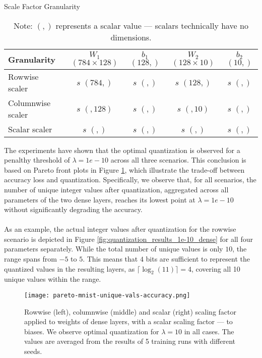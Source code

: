 \begin{table}[h!]
  \centering
  \caption{Scale Factor Granularity}
  \label{tab:scalefactorgranularitydense}
  \begin{tabular}{l|c|c|c|c}
  \hline
  \textbf{Granularity}        & \( W_1 \) \( (784 \times 128) \)       & \( b_1 \) \( (128,) \)        & \( W_2 \) \( (128 \times 10) \)     & \( b_2 \) \( (10,) \) \\ \hline
  Rowwise scaler              & \( s \) \( (784, ) \)                 & \( s \) \( (,) \)             & \( s \) \( (128, ) \)              & \( s \) \( (,) \)     \\ \hline
  Columnwise scaler           & \( s \) \( (,128) \)                  & \( s \) \( (,) \)             & \( s \) \( (,10) \)                & \( s \) \( (,) \)     \\ \hline
  Scalar scaler               & \( s \) \( (,) \)                     & \( s \) \( (,) \)             & \( s \) \( (,) \)                  & \( s \) \( (,) \)     \\ \hline
  \end{tabular}
  \vspace{0.5em}
  \caption*{\footnotesize Note: \( (,) \) represents a scalar value — scalars technically have no dimensions.}
\end{table}

\noindent The experiments have shown that the optimal quantization is observed for a penalthy threshold of 
\( \lambda = 1e-10 \) across all three scenarios.
This conclusion is based on Pareto front plots in Figure \ref{fig:pareto-mnist-unique-vals-accuracy},
which illustrate the trade-off between accuracy loss and quantization.
Specifically, we observe that, for all scenarios, 
the number of unique integer values after quantization, 
aggregated across all parameters of the two dense layers, reaches its lowest point at \( \lambda = 1e-10 \)
without significantly degrading the accuracy.
\\
\\
As an example, the actual integer values after quantization for the rowwise scenario is 
depicted in Figure \ref{fig:quantization_results_1e-10_dense} for all four parameters separately.
While the total number of unique values is only \( 10 \), the range spans from \( -5 \) to \( 5 \).
This means that \( 4 \) bits are sufficient to represent the quantized values in the resulting layers, 
as \( \lceil \log_2(11) \rceil = 4 \), covering all 10 unique values within the range.
\\
\begin{figure}[h!]
  \centering
  \texttt{[image: pareto-mnist-unique-vals-accuracy.png]}
  \caption{Rowwise (left), columnwise (middle) and scalar (right) scaling factor applied to weights of dense layers, with a scalar scaling factor — to biases.
  We observe optimal quantization for \( \lambda = 10\)  in all cases. The values are averaged from the results of 5 training runs with different seeds.}
  \label{fig:pareto-mnist-unique-vals-accuracy}
\end{figure}


